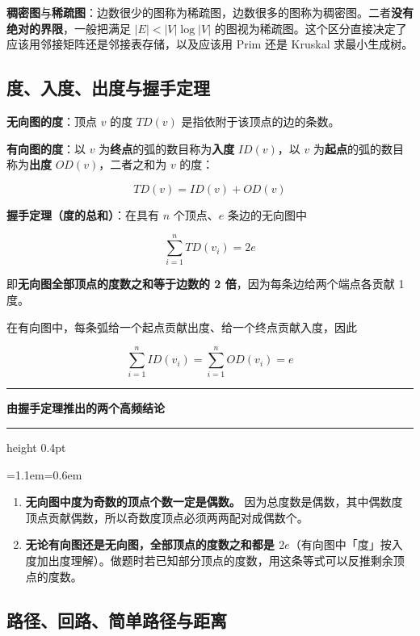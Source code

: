 \documentclass[11pt,openany,UTF8]{ctexbook}
\newcommand{\callouthead}[2]{%
  \par\addvspace{7pt}\noindent
  {\color{#1}\rule[-0.15em]{3pt}{1.05em}}\hspace{0.5em}%
  {\bfseries\color{#1}#2}\par\nobreak\vspace{-0.35em}%
  {\color{rulesep}\hrule height 0.4pt}\nobreak\vspace{0.45em}%
  \begingroup\small\setlength{\parindent}{0pt}%
  \leftskip=1.1em\rightskip=0.6em\noindent\ignorespaces}
\newcommand{\calloutend}{\par\endgroup\addvspace{7pt}}
\newenvironment{callwarn}[1]{\callouthead{warnbar}{#1}}{\calloutend}
\begin{document}
\textbf{稠密图}与\textbf{稀疏图}：边数很少的图称为稀疏图，边数很多的图称为稠密图。二者\textbf{没有绝对的界限}，一般把满足 $|E|<|V|\log|V|$ 的图视为稀疏图。这个区分直接决定了应该用邻接矩阵还是邻接表存储，以及应该用 Prim 还是 Kruskal 求最小生成树。

\subsection{度、入度、出度与握手定理}

\textbf{无向图的度}：顶点 $v$ 的度 $TD(v)$ 是指依附于该顶点的边的条数。

\textbf{有向图的度}：以 $v$ 为\textbf{终点}的弧的数目称为\textbf{入度} $ID(v)$，以 $v$ 为\textbf{起点}的弧的数目称为\textbf{出度} $OD(v)$，二者之和为 $v$ 的度：

\[TD(v)=ID(v)+OD(v)\]

\textbf{握手定理（度的总和）}：在具有 $n$ 个顶点、$e$ 条边的无向图中

\[\sum_{i=1}^{n} TD(v_i)=2e\]

即\textbf{无向图全部顶点的度数之和等于边数的 2 倍}，因为每条边给两个端点各贡献 1 度。

在有向图中，每条弧给一个起点贡献出度、给一个终点贡献入度，因此

\[\sum_{i=1}^{n} ID(v_i)=\sum_{i=1}^{n} OD(v_i)=e\]

\begin{callwarn}{由握手定理推出的两个高频结论}
\begin{enumerate}
\item \textbf{无向图中度为奇数的顶点个数一定是偶数。} 因为总度数是偶数，其中偶数度顶点贡献偶数，所以奇数度顶点必须两两配对成偶数个。
\item \textbf{无论有向图还是无向图，全部顶点的度数之和都是 $2e$}（有向图中「度」按入度加出度理解）。做题时若已知部分顶点的度数，用这条等式可以反推剩余顶点的度数。
\end{enumerate}
\end{callwarn}

\subsection{路径、回路、简单路径与距离}
\end{document}
